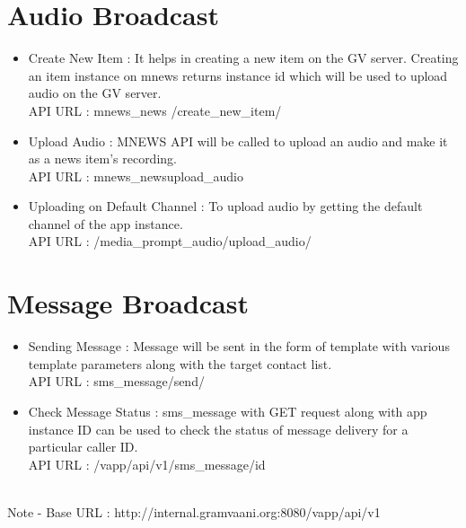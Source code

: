 \section{Audio Broadcast}
\begin{itemize}
\item Create New Item : It helps in creating a new item on the GV server. Creating an item instance on mnews returns instance id which will be used to upload audio on the GV server.
\ \\
API URL : mnews\_news /create\_new\_item/
\item Upload Audio : MNEWS API will be called to upload an audio and make it as a news item's recording.
\ \\
API URL : mnews\_news\/upload\_audio\/
\item Uploading on Default Channel : To upload audio by getting the default channel of the app instance.
\ \\
API URL : /media\_prompt\_audio/upload\_audio/
\end{itemize}

\newpage
\section{Message Broadcast}
\begin{itemize}
\item Sending Message : Message will be sent in the form of template with various template parameters along with the target contact list.
\ \\
API URL : sms\_message/send/
\item Check Message Status : sms\_message with GET request along with app instance ID can be used to check the status of message delivery for a particular caller ID.
\ \\
API URL : /vapp/api/v1/sms\_message/id
\end{itemize}

\ \\

Note - Base URL : http://internal.gramvaani.org:8080/vapp/api/v1
